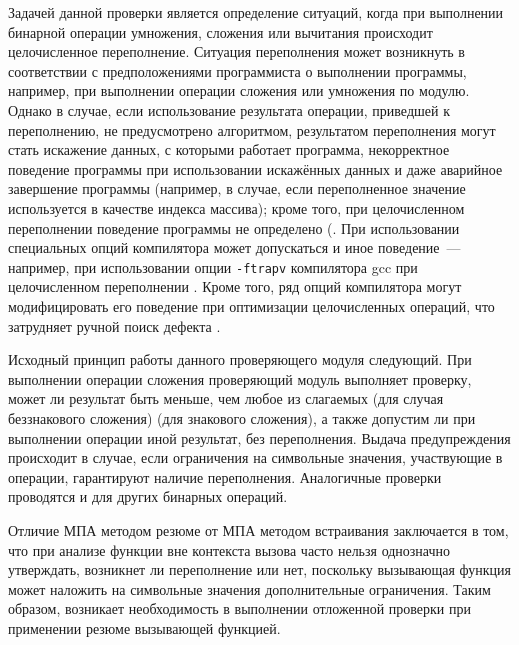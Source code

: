Задачей данной проверки является определение ситуаций, когда при выполнении бинарной операции умножения, сложения или вычитания происходит целочисленное переполнение. Ситуация переполнения может возникнуть в соответствии с предположениями программиста о выполнении программы, например, при выполнении операции сложения или умножения по модулю. Однако в случае, если использование результата операции, приведшей к переполнению, не предусмотрено алгоритмом, результатом переполнения могут стать искажение данных, с которыми работает программа, некорректное поведение программы при использовании искажённых данных и даже аварийное завершение программы (например, в случае, если переполненное значение используется в качестве индекса массива); кроме того, при целочисленном переполнении  поведение программы не определено (. При использовании специальных опций компилятора может допускаться и иное поведение~--- например, при использовании опции \texttt{-ftrapv} компилятора gcc при целочисленном переполнении . Кроме того, ряд опций компилятора могут модифицировать его поведение при оптимизации целочисленных операций, что затрудняет ручной поиск дефекта .

Исходный принцип работы данного проверяющего модуля следующий. При выполнении операции сложения проверяющий модуль выполняет проверку, может ли результат быть меньше, чем любое из слагаемых (для случая беззнакового сложения)  (для знакового сложения), а также допустим ли при выполнении операции иной результат, без переполнения. Выдача предупреждения происходит в случае, если ограничения на символьные значения, участвующие в операции, гарантируют наличие переполнения. Аналогичные проверки проводятся и для других бинарных операций.

Отличие МПА методом резюме от МПА методом встраивания заключается в том, что при анализе функции вне контекста вызова часто нельзя однозначно утверждать, возникнет ли переполнение или нет, поскольку вызывающая функция может наложить на символьные значения дополнительные ограничения. Таким образом, возникает необходимость в выполнении отложенной проверки при применении резюме вызывающей функцией.


